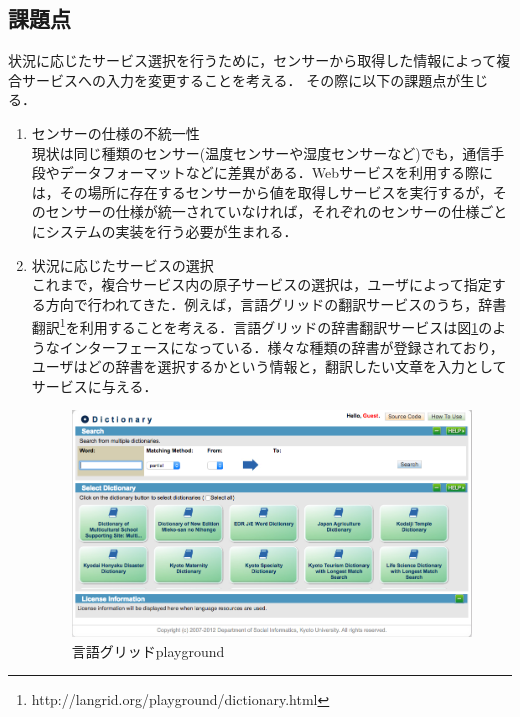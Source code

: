 \documentclass{kuisthesis}			%
\begin{document}
\subsection{課題点}
状況に応じたサービス選択を行うために，センサーから取得した情報によって複合サービスへの入力を変更することを考える．
その際に以下の課題点が生じる．
\begin{enumerate}
\item センサーの仕様の不統一性\\
現状は同じ種類のセンサー(温度センサーや湿度センサーなど)でも，通信手段やデータフォーマットなどに差異がある．Webサービスを利用する際には，その場所に存在するセンサーから値を取得しサービスを実行するが，そのセンサーの仕様が統一されていなければ，それぞれのセンサーの仕様ごとにシステムの実装を行う必要が生まれる．
\item 状況に応じたサービスの選択\\
これまで，複合サービス内の原子サービスの選択は，ユーザによって指定する方向で行われてきた．例えば，言語グリッドの翻訳サービスのうち，辞書翻訳\footnote{http://langrid.org/playground/dictionary.html}を利用することを考える．言語グリッドの辞書翻訳サービスは図\ref{fig:langrid}のようなインターフェースになっている．様々な種類の辞書が登録されており，ユーザはどの辞書を選択するかという情報と，翻訳したい文章を入力としてサービスに与える．\\

\begin{figure}
\label{fig:langrid}
 \begin{center}
  \includegraphics[width=\linewidth]{pic/langrid.png}
  \caption{言語グリッドplayground}
 \end{center}
\end{figure}



\end{enumerate}
\end{document}
